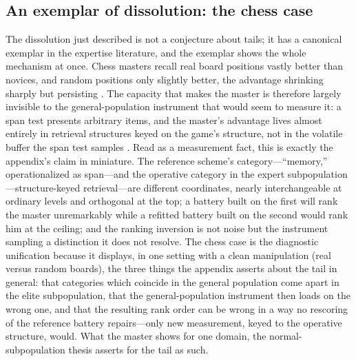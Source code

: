 \documentclass{article}
\begin{document}
\subsection{An exemplar of dissolution: the chess case}\label{app:cam}
The dissolution just described is not a conjecture about tails; it has a canonical exemplar in the expertise literature, and the exemplar shows the whole mechanism at once. Chess masters recall real board positions vastly better than novices, and random positions only slightly better, the advantage shrinking sharply but persisting \cite{chase1973perception, gobet1996templates, gobet1996recall}. The capacity that makes the master is therefore largely invisible to the general-population instrument that would seem to measure it: a span test presents arbitrary items, and the master's advantage lives almost entirely in retrieval structures keyed on the game's structure, not in the volatile buffer the span test samples \cite{ericsson1995ltwm}. Read as a measurement fact, this is exactly the appendix's claim in miniature. The reference scheme's category---``memory,'' operationalized as span---and the operative category in the expert subpopulation---structure-keyed retrieval---are different coordinates, nearly interchangeable at ordinary levels and orthogonal at the top; a battery built on the first will rank the master unremarkably while a refitted battery built on the second would rank him at the ceiling; and the ranking inversion is not noise but the instrument sampling a distinction it does not resolve. The chess case is the diagnostic unification because it displays, in one setting with a clean manipulation (real versus random boards), the three things the appendix asserts about the tail in general: that categories which coincide in the general population come apart in the elite subpopulation, that the general-population instrument then loads on the wrong one, and that the resulting rank order can be wrong in a way no rescoring of the reference battery repairs---only new measurement, keyed to the operative structure, would. What the master shows for one domain, the normal-subpopulation thesis asserts for the tail as such.
\end{document}
